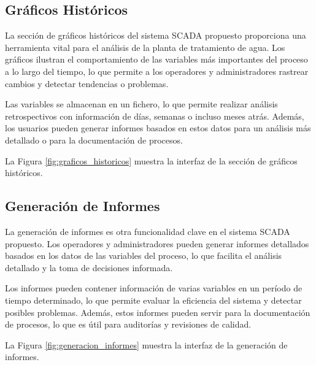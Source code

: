 \subsection{Gráficos Históricos}

La sección de gráficos históricos del sistema SCADA propuesto proporciona una herramienta vital para el análisis de la planta de tratamiento de agua. Los gráficos ilustran el comportamiento de las variables más importantes del proceso a lo largo del tiempo, lo que permite a los operadores y administradores rastrear cambios y detectar tendencias o problemas.

Las variables se almacenan en un fichero, lo que permite realizar análisis retrospectivos con información de días, semanas o incluso meses atrás. Además, los usuarios pueden generar informes basados en estos datos para un análisis más detallado o para la documentación de procesos.

La Figura \ref{fig:graficos_historicos} muestra la interfaz de la sección de gráficos históricos.


\subsection{Generación de Informes}

La generación de informes es otra funcionalidad clave en el sistema SCADA propuesto. Los operadores y administradores pueden generar informes detallados basados en los datos de las variables del proceso, lo que facilita el análisis detallado y la toma de decisiones informada.

Los informes pueden contener información de varias variables en un período de tiempo determinado, lo que permite evaluar la eficiencia del sistema y detectar posibles problemas. Además, estos informes pueden servir para la documentación de procesos, lo que es útil para auditorías y revisiones de calidad.

La Figura \ref{fig:generacion_informes} muestra la interfaz de la generación de informes.





